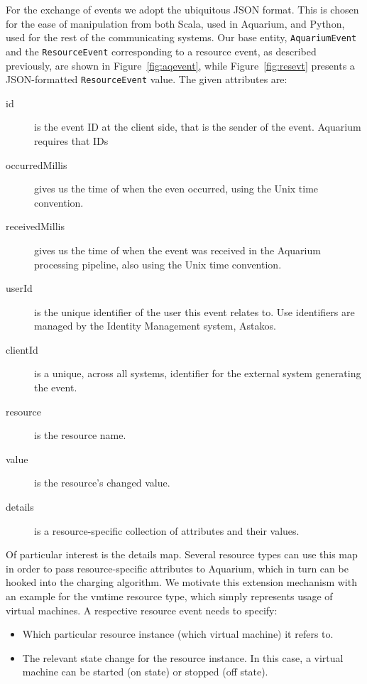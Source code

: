 \documentclass[preprint,10pt]{sigplanconf}
\begin{document}
For the exchange of events we adopt the ubiquitous JSON format. This is chosen for the ease of manipulation from both Scala, used in Aquarium, and Python, used for the rest of the communicating systems. Our base entity, \texttt{AquariumEvent} and the \texttt{ResourceEvent} corresponding to a resource event, as described previously, are shown in Figure~\ref{fig:aqevent}, while Figure~\ref{fig:resevt} presents a JSON-formatted \texttt{ResourceEvent} value. The given attributes are:

\begin{description}
\item[id] is the event \textsf{ID} at the client side, that is the sender of the event. Aquarium requires that \textsf{IDs}

\item[occurredMillis] gives us the time of when the even occurred, using the Unix time convention.

\item[receivedMillis] gives us the time of when the event was received in the Aquarium processing pipeline, also using the Unix time convention.

\item[userId] is the unique identifier of the user this event relates to. Use identifiers are managed by the Identity Management system, Astakos.

\item[clientId] is a unique, across all systems, identifier for the external system generating the event.

\item[resource] is the resource name.

\item[value] is the resource's changed value.

\item[details] is a resource-specific collection of  attributes and their values.
\end{description}

Of particular interest is the \textsf{details} map. Several resource types can use this map in order to pass resource-specific attributes to Aquarium, which in turn can be hooked into the charging algorithm. We motivate this extension mechanism with an example for the \textsf{vmtime} resource type, which simply represents usage of virtual machines. A respective resource event needs to specify:
\begin{itemize}
\item Which particular resource instance (which virtual machine) it refers to.
\item The relevant state change for the resource instance. In this case, a virtual machine can be started (\textsf{on} state) or stopped (\textsf{off} state).
\end{itemize}
\end{document}
